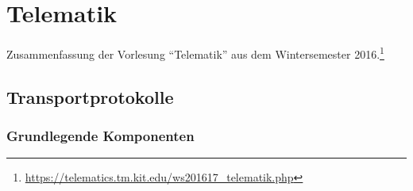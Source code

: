 \chapter{Telematik}

Zusammenfassung der Vorlesung "`Telematik"' aus dem Wintersemester 2016.\footnote{\url{https://telematics.tm.kit.edu/ws201617_telematik.php}}

\section{Transportprotokolle}

\subsection{Grundlegende Komponenten}


